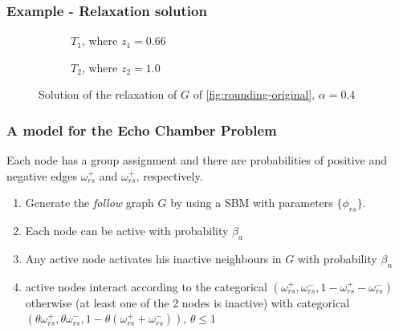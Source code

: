 \documentclass{beamer}
\begin{document}
\begin{frame}[c]
	\frametitle{Example - Relaxation solution}
	\begin{figure}
		\begin{center}
			\begin{subfigure}[b]{0.4\textwidth}
				\centering
				\caption{$T_1$, where $z_1 = 0.66$}
				\label{fig:rounding-relaxed-t1}
			\end{subfigure}
			\begin{subfigure}[b]{0.4\textwidth}
				\centering
				\caption{$T_2$, where $z_2 = 1.0$}
				\label{fig:rounding-relaxed-t2}
			\end{subfigure}
		\end{center}
		\caption{Solution of the relaxation of $G$ of
			\autoref{fig:rounding-original}, $\alpha = 0.4$}
		\label{fig:rounding-relaxed}
	\end{figure}
\end{frame}

\begin{frame}[c]
	\frametitle{A model for the Echo Chamber Problem}
	Each node has a group assignment and there are probabilities of
	positive and negative edges $\omega _{rs}^{+}  $ and $\omega _{rs}^{+}  $,
	respectively.

	\begin{enumerate}
		\item Generate the \emph{follow} graph $G$ by using a SBM with parameters
		      $\{ \phi _{rs}  \}$.
		\item Each node can be active with probability $\beta_{a}  $
		\item Any active node activates his inactive neighbours in $G$ with
		      probability $\beta_n$
		\item active nodes interact according to the categorical $(\omega _{rs}
			      ^{+}, \omega _{rs} ^{-}, 1 - \omega _{rs} ^{+} - \omega _{rs} ^{-})
		      $ otherwise (at least one of the 2 nodes is inactive) with
		      categorical $(\theta \omega _{rs} ^{+}, \theta \omega _{rs} ^{-}, 1
			      - \theta (\omega _{rs} ^{+} + \omega _{rs} ^{-}))$, $\theta \leq 1$
	\end{enumerate}

\end{frame}
\end{document}
